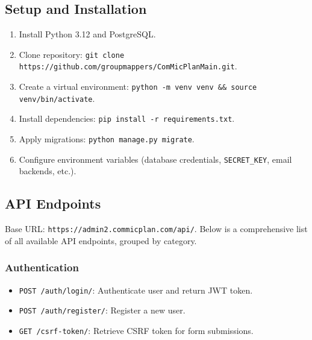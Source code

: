 \documentclass[11pt]{article}
\begin{document}
\subsection{Setup and Installation}
\begin{enumerate}[leftmargin=*]
  \item Install Python 3.12 and PostgreSQL.
  \item Clone repository: \verb|git clone https://github.com/groupmappers/ComMicPlanMain.git|.
  \item Create a virtual environment: \verb|python -m venv venv && source venv/bin/activate|.
  \item Install dependencies: \verb|pip install -r requirements.txt|.
  \item Apply migrations: \verb|python manage.py migrate|.
  \item Configure environment variables (database credentials, \verb|SECRET_KEY|, email backends, etc.).
\end{enumerate}

\subsection{API Endpoints}
Base URL: \verb|https://admin2.commicplan.com/api/|. Below is a comprehensive list of all available API endpoints, grouped by category.

\subsubsection{Authentication}
\begin{itemize}[leftmargin=*]
  \item \verb|POST /auth/login/|: Authenticate user and return JWT token.
  \item \verb|POST /auth/register/|: Register a new user.
  \item \verb|GET /csrf-token/|: Retrieve CSRF token for form submissions.
\end{itemize}
\end{document}
